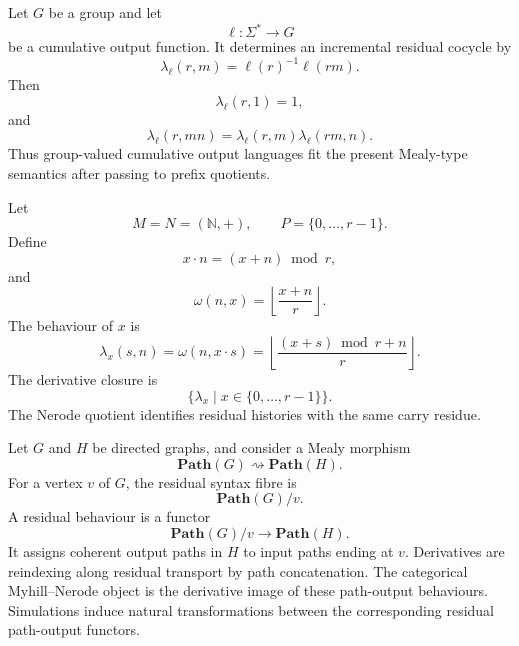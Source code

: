 \begin{example}
\label{ex:group-valued-cumulative-output-languages}
    Let \(G\) be a group and let
    \[
        \ell:\Sigma^*\to G
    \]
    be a cumulative output function. It determines an incremental residual cocycle by
    \[
        \lambda_\ell(r,m)=\ell(r)^{-1}\ell(rm).
    \]
    Then
    \[
        \lambda_\ell(r,1)=1,
    \]
    and
    \[
        \lambda_\ell(r,mn)
        =
        \lambda_\ell(r,m)\lambda_\ell(rm,n).
    \]
    Thus group-valued cumulative output languages fit the present Mealy-type semantics after passing to prefix quotients.
\end{example}

\begin{example}
\label{ex:base-r-carry-machine}
    Let
    \[
        M=N=(\mathbb N,+),
        \qquad
        P=\{0,\dots,r-1\}.
    \]
    Define
    \[
        x\cdot n=(x+n)\bmod r,
    \]
    and
    \[
        \omega(n,x)=\left\lfloor\frac{x+n}{r}\right\rfloor.
    \]
    The behaviour of \(x\) is
    \[
        \lambda_x(s,n)
        =
        \omega(n,x\cdot s)
        =
        \left\lfloor
        \frac{(x+s)\bmod r+n}{r}
        \right\rfloor.
    \]
    The derivative closure is
    \[
        \{\lambda_x\mid x\in\{0,\dots,r-1\}\}.
    \]
    The Nerode quotient identifies residual histories with the same carry residue.
\end{example}

\begin{example}
\label{ex:typed-path-category-machines}
    Let \(G\) and \(H\) be directed graphs, and consider a Mealy morphism
    \[
        \mathbf{Path}(G)\rightsquigarrow\mathbf{Path}(H).
    \]
    For a vertex \(v\) of \(G\), the residual syntax fibre is
    \[
        \mathbf{Path}(G)/v.
    \]
    A residual behaviour is a functor
    \[
        \mathbf{Path}(G)/v\to\mathbf{Path}(H).
    \]
    It assigns coherent output paths in \(H\) to input paths ending at \(v\). Derivatives are reindexing along residual transport by path concatenation. The categorical Myhill--Nerode object is the derivative image of these path-output behaviours. Simulations induce natural transformations between the corresponding residual path-output functors.
\end{example}

